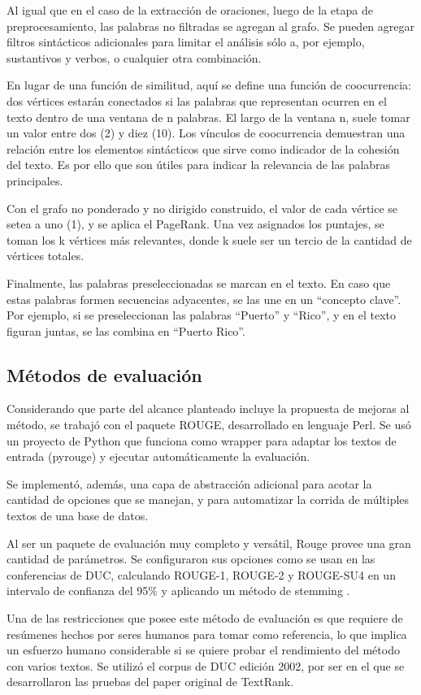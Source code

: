 \documentclass[a4paper]{article}
\begin{document}
Al igual que en el caso de la extracción de oraciones, luego de la etapa de preprocesamiento, las palabras no filtradas se agregan al grafo. Se pueden agregar filtros sintácticos adicionales para limitar el análisis sólo a, por ejemplo, sustantivos y verbos, o cualquier otra combinación. 

En lugar de una función de similitud, aquí se define una función de coocurrencia: dos vértices estarán conectados si las palabras que representan ocurren en el texto dentro de una ventana de n palabras. El largo de la ventana n, suele tomar un valor entre dos (2) y diez (10). Los vínculos de coocurrencia demuestran una relación entre los elementos sintácticos que sirve como indicador de la cohesión del texto. Es por ello que son útiles para indicar la relevancia de las palabras principales.

Con el grafo no ponderado y no dirigido construido, el valor de cada vértice se setea a uno (1), y se aplica el PageRank. Una vez asignados los puntajes, se toman los k vértices más relevantes, donde k suele ser un tercio de la cantidad de vértices totales. 

Finalmente, las palabras preseleccionadas se marcan en el texto. En caso que estas palabras formen secuencias adyacentes, se las une en un “concepto clave”. Por ejemplo, si se preseleccionan las palabras “Puerto” y “Rico”, y en el texto figuran juntas, se las combina en “Puerto Rico”.


\subsection{Métodos de evaluación}
Considerando que parte del alcance planteado incluye la propuesta de mejoras al método, se trabajó con el paquete ROUGE, desarrollado en lenguaje Perl. Se usó un proyecto de Python que funciona como wrapper para adaptar los textos de entrada (pyrouge) y ejecutar automáticamente la evaluación. 

Se implementó, además, una capa de abstracción adicional para acotar la cantidad de opciones que se manejan, y para automatizar la corrida de múltiples textos de una base de datos.

Al ser un paquete de evaluación muy completo y versátil, Rouge provee una gran cantidad de parámetros. Se configuraron sus opciones como se usan en las conferencias de DUC, calculando ROUGE-1, ROUGE-2 y ROUGE-SU4 en un intervalo de confianza del 95\% y aplicando un método de stemming \cite{duc2007}. 

Una de las restricciones que posee este método de evaluación es que requiere de resúmenes hechos por seres humanos para tomar como referencia, lo que implica un esfuerzo humano considerable si se quiere probar el rendimiento del método con varios textos. Se utilizó el corpus de DUC edición 2002, por ser en el que se desarrollaron las pruebas del paper original de TextRank.
\end{document}
